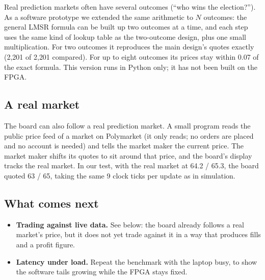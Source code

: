 \documentclass[11pt]{article}
\newcommand{\cent}{\textcent}
\begin{document}
Real prediction markets often have several outcomes (``who wins the
election?''). As a software prototype we extended the same arithmetic to $N$
outcomes: the general LMSR formula can be built up two outcomes at a time, and
each step uses the same kind of lookup table as the two-outcome design, plus
one small multiplication. For two outcomes it reproduces the main design's
quotes exactly (2{,}201 of 2{,}201 compared). For up to eight outcomes its
prices stay within 0.07\cent{} of the exact formula. This version runs in
Python only; it has not been built on the FPGA.

\subsection{A real market}

The board can also follow a real prediction market. A small program reads the
public price feed of a market on Polymarket (it only reads; no orders are
placed and no account is needed) and tells the market maker the current price.
The market maker shifts its quotes to sit around that price, and the board's
display tracks the real market. In our test, with the real market at
64.2\cent{} / 65.3\cent{}, the board quoted 63\cent{} / 65\cent{}, taking the
same 9 clock ticks per update as in simulation.

\subsection*{What comes next}

\begin{itemize}
  \item \textbf{Trading against live data.} See below: the board already
        follows a real market's price, but it does not yet trade against it
        in a way that produces fills and a profit figure.
  \item \textbf{Latency under load.} Repeat the benchmark with the laptop
        busy, to show the software tails growing while the FPGA stays fixed.
\end{itemize}
\end{document}
